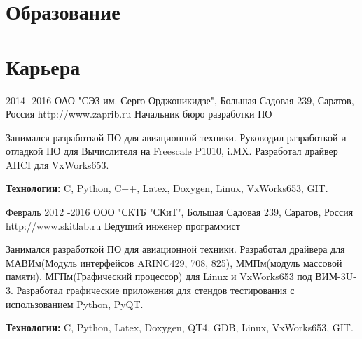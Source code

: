 \section{Образование}





\section{Карьера}

\job
{2014 -}{2016}
{ОАО "СЭЗ им. Серго Орджоникидзе", Большая Садовая 239, Саратов, Россия}
{http://www.zaprib.ru}
{Начальник бюро разработки ПО}
{Занимался разработкой ПО для авиационной техники. Руководил разработкой и отладкой ПО для Вычислителя на Freescale P1010, i.MX. Разработал драйвер AHCI для VxWorks653.
\rule{0mm}{5mm}\textbf{Технологии:} C, Python, C++, Latex, Doxygen, Linux, VxWorks653, GIT.}



\job
{Февраль 2012 -}{2016}
{ООО "СКТБ "СКиТ", Большая Садовая 239, Саратов, Россия}
{http://www.skitlab.ru}
{Ведущий инженер программист}
{Занимался разработкой ПО для авиационной техники. Разработал драйвера для МАВИм(Модуль интерфейсов ARINC429, 708, 825), ММПм(модуль массовой памяти), МГПм(Графический процессор) для Linux и VxWorks653 под ВИМ-3U-3. Разработал графические приложения для стендов тестирования с использованием Python, PyQT.
\rule{0mm}{5mm}\textbf{Технологии:} C, Python, Latex, Doxygen, QT4, GDB, Linux, VxWorks653, GIT.}


